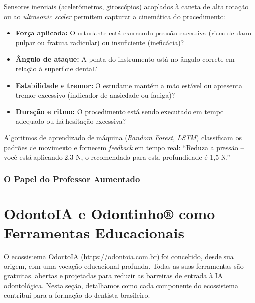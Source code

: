 Sensores inerciais (acelerômetros, giroscópios) acoplados à caneta de alta
rotação ou ao \textit{ultrasonic scaler} permitem capturar a cinemática do
procedimento:

\begin{itemize}
  \item \textbf{Força aplicada:} O estudante está exercendo pressão excessiva
    (risco de dano pulpar ou fratura radicular) ou insuficiente (ineficácia)?
  \item \textbf{Ângulo de ataque:} A ponta do instrumento está no ângulo
    correto em relação à superfície dental?
  \item \textbf{Estabilidade e tremor:} O estudante mantém a mão estável ou
    apresenta tremor excessivo (indicador de ansiedade ou fadiga)?
  \item \textbf{Duração e ritmo:} O procedimento está sendo executado em tempo
    adequado ou há hesitação excessiva?
\end{itemize}

Algoritmos de aprendizado de máquina (\textit{Random Forest}, \textit{LSTM})
classificam os padrões de movimento e fornecem \textit{feedback} em tempo real:
``Reduza a pressão -- você está aplicando 2,3 N, o recomendado para esta
profundidade é 1,5 N.''

\subsubsection{O Papel do Professor Aumentado}


\section{OdontoIA e Odontinho® como Ferramentas Educacionais}
\label{sec:odontoia-educacional}

\nivelquatro

O ecossistema OdontoIA (\url{https://odontoia.com.br}) foi concebido, desde sua
origem, com uma vocação educacional profunda. Todas as suas ferramentas são
gratuitas, abertas e projetadas para reduzir as barreiras de entrada à IA
odontológica. Nesta seção, detalhamos como cada componente do ecossistema
contribui para a formação do dentista brasileiro.

